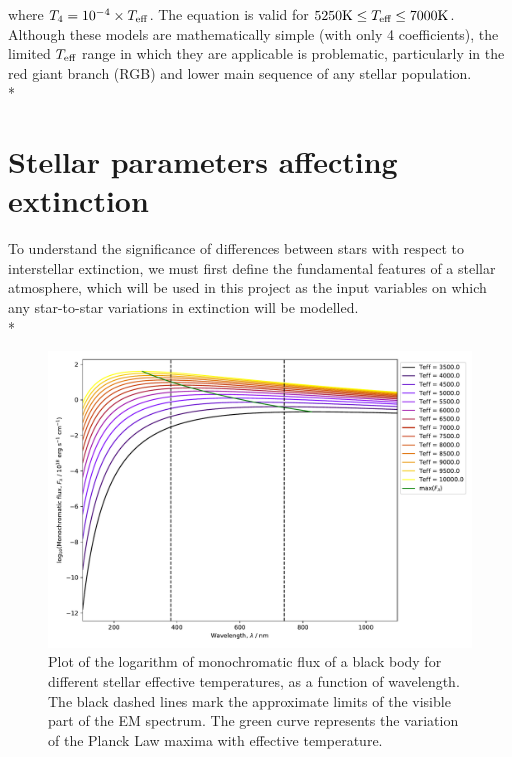 \documentclass[12pt, a4paper]{report}
\begin{document}
where $T_{4} = 10^{-4} \times T_{\textnormal{eff}}$. The equation is valid for $5250\textnormal{K} \leq T_{\textnormal{eff}} \leq 7000\textnormal{K}$. Although these models are mathematically simple (with only 4 coefficients), the limited $T_{\textnormal{eff}}$ range in which they are applicable is problematic, particularly in the red giant branch (RGB) and lower main sequence of any stellar population.\\*

\section{Stellar parameters affecting extinction} \label{params}
To understand the significance of differences between stars with respect to interstellar extinction, we must first define the fundamental features of a stellar atmosphere, which will be used in this project as the input variables on which any star-to-star variations in extinction will be modelled. \\*

\begin{figure}[h]
\begin{center}
\includegraphics[scale=0.5]{blackbody_teff_logF_illustration.pdf}
\caption{Plot of the logarithm of monochromatic flux of a black body for different stellar effective temperatures, as a function of wavelength. The black dashed lines mark the approximate limits of the visible part of the EM spectrum. The green curve represents the variation of the Planck Law maxima with effective temperature.}
\label{planck_curve}
\end{center}
\end{figure}
\end{document}
